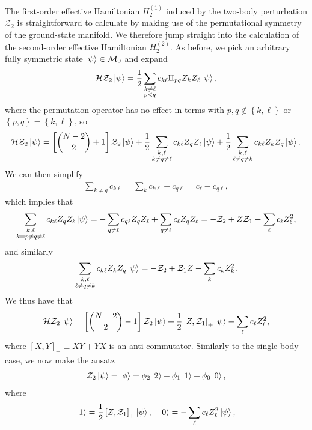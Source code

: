 \documentclass[nofootinbib,notitlepage,11pt]{revtex4-2}
\newcommand{\f}[2]{\dfrac{#1}{#2}} %
\newcommand{\p}[1]{\left(#1\right)} %
\renewcommand{\sp}[1]{\left[#1\right]} %
\renewcommand{\set}[1]{\left\{#1\right\}} %
\newcommand{\1}{\mathds{1}}
\renewcommand{\H}{\mathcal{H}}
\newcommand{\M}{\mathcal{M}}
\newcommand{\Z}{\mathcal{Z}}
\begin{document}
The first-order effective Hamiltonian $H_2^{(1)}$ induced by the
two-body perturbation $\Z_2$ is straightforward to calculate by making
use of the permutational symmetry of the ground-state manifold.  We
therefore jump straight into the calculation of the second-order
effective Hamiltonian $H_2^{(2)}$.  As before, we pick an arbitrary
fully symmetric state $\ket\psi\in\M_0$ and expand
\begin{align}
  \H \Z_2 \ket\psi
  = \f12 \sum_{\substack{k\ne\ell\\p<q}}
  c_{k\ell} \Pi_{pq} Z_k Z_\ell \ket\psi,
\end{align}
where the permutation operator has no effect in terms with
$p,q\notin\set{k,\ell}$ or $\set{p,q}=\set{k,\ell}$, so
\begin{align}
  \H \Z_2 \ket\psi
  = \sp{{N-2 \choose 2} + 1} \Z_2 \ket\psi
  + \f12 \sum_{\substack{k,\ell\\k\ne q\ne\ell}}
  c_{k\ell} Z_q Z_\ell \ket\psi
  + \f12 \sum_{\substack{k,\ell\\\ell\ne q\ne k}}
  c_{k\ell} Z_k Z_q \ket\psi.
\end{align}
We can then simplify
\begin{align}
  \sum_{k\ne q} c_{k\ell}
  = \sum_k c_{k\ell} - c_{q\ell}
  = c_\ell - c_{q\ell},
\end{align}
which implies that
\begin{align}
  \sum_{\substack{k,\ell\\k=p\ne q\ne\ell}}
  c_{k\ell} Z_q Z_\ell \ket\psi
  = - \sum_{q\ne\ell} c_{q\ell} Z_q Z_\ell
  + \sum_{q\ne\ell} c_\ell Z_q Z_\ell
  = - \Z_2 + Z \Z_1 - \sum_\ell c_\ell Z_\ell^2,
\end{align}
and similarly
\begin{align}
  \sum_{\substack{k,\ell\\\ell\ne q\ne k}} c_{k\ell} Z_k Z_q \ket\psi
  = - \Z_2 + \Z_1 Z - \sum_k c_k Z_k^2.
\end{align}
We thus have that
\begin{align}
  \H \Z_2 \ket\psi = \sp{{ N-2\choose 2 } - 1} \Z_2 \ket\psi
  + \f12 \sp{Z,\Z_1}_+ \ket\psi - \sum_\ell c_\ell Z_\ell^2,
\end{align}
where $\sp{X,Y}_+ \equiv X Y + Y X$ is an anti-commutator.  Similarly
to the single-body case, we now make the ansatz
\begin{align}
  \Z_2 \ket\psi = \ket\phi
  = \phi_2 \ket{2} + \phi_1 \ket{1} + \phi_0 \ket{0},
\end{align}
where
\begin{align}
  \ket{1} = \f12 \sp{Z,\Z_1}_+ \ket\psi,
  &&
  \ket{0} = - \sum_\ell c_\ell Z_\ell^2 \ket\psi,
\end{align}
\end{document}
